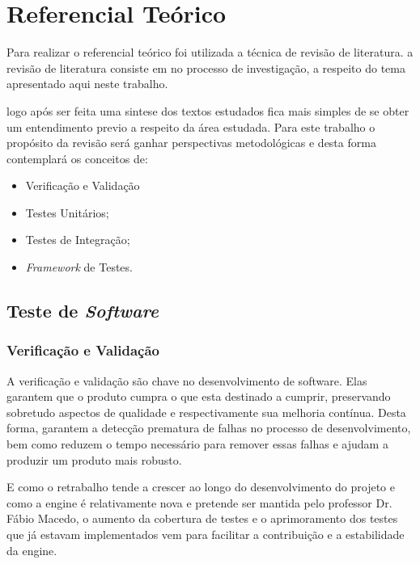 \chapter{Referencial Teórico}

    Para realizar o referencial teórico foi utilizada a técnica de revisão de literatura.
    a revisão de literatura consiste em no processo de investigação, a respeito do tema apresentado aqui neste trabalho.

    logo após ser feita uma sintese dos textos estudados fica mais simples de se obter um entendimento previo a respeito da área estudada.
    Para este trabalho o propósito da revisão será ganhar perspectivas metodológicas e desta forma contemplará os conceitos de:

    \begin{itemize}

        \item Verificação e Validação
        \item Testes Unitários;
        \item Testes de Integração;
        \item \textit{Framework} de Testes.

    \end{itemize}

\vfill
\pagebreak

\section{Teste de \textit{Software}}
   
\subsection{Verificação e Validação}

A verificação e validação são chave no desenvolvimento de software.
Elas garantem que o produto cumpra o que esta destinado a cumprir,
preservando sobretudo aspectos de qualidade e respectivamente sua melhoria contínua.
Desta forma, garantem a detecção prematura de falhas no processo de desenvolvimento,
bem como reduzem o tempo necessário para remover essas falhas e ajudam a produzir um
produto mais robusto.


E como o retrabalho tende a crescer ao longo do desenvolvimento do projeto e como a engine é relativamente nova e pretende ser mantida pelo professor Dr. Fábio Macedo, o aumento da cobertura de testes e o aprimoramento dos testes que já estavam implementados vem para facilitar a contribuição e a estabilidade da engine.

